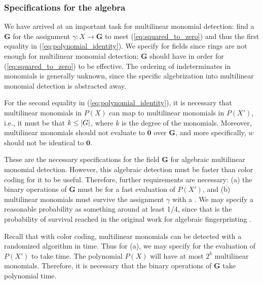 \subsubsection{Specifications for the algebra}
\label{sect:algebra_specs}

We have arrived at an important task for multilinear monomial detection: 
find a  $\mathbf{G}$ for 
the assignment $\gamma \colon X \to \mathbf{G}$ to meet 
(\ref{eq:squared_to_zero}) and thus the first equality in (\ref{eq:polynomial_identity}). 
We specify for fields since rings are not enough for multilinear monomial detection; 
$\mathbf{G}$ should have
 in order for (\ref{eq:squared_to_zero}) 
to be effective. The ordering of indeterminates in monomials is generally unknown, 
since the specific algebrization into multilinear monomial detection 
is abstracted away. %

For the second equality in (\ref{eq:polynomial_identity}), it is necessary that multilinear 
monomials in $P(X)$ can map to multilinear monomials in $P(X')$, i.e., it must
be that 
$k \leq {\left\vert G\right\vert}$, where $k$ is the degree of the monomials. 
Moreover, multilinear monomials 
should not evaluate to $\mathbf{0}$ over $\mathbf{G}$, and more specifically, 
$w$ should not be identical to $\mathbf{0}$.

These are the necessary specifications for the field $\mathbf{G}$ for algebraic multilinear monomial detection. 
However, this algebraic detection must be faster than color coding for it to be useful. 
Therefore, further requirements are necessary: (a) the binary operations of $\mathbf{G}$ 
must be
for a fast evaluation of $P(X')$, and (b) multilinear monomials must 
survive the assignment $\gamma$ with a
. 
We may specify a reasonable probability as something around at least 1/4, since that is 
the probability of survival reached in the original work for algebraic fingerprinting \cite{Koutis08}.

Recall that with color coding, multilinear monomials can be detected with a 
randomized algorithm in  time. Thus for (a), we may specify for 
the evaluation of $P(X')$ to take  time. The polynomial $P(X)$ 
will have at most $2^k$ multilinear monomials. Therefore, 
it is necessary that the binary operations 
of $\mathbf{G}$ take polynomial time.

